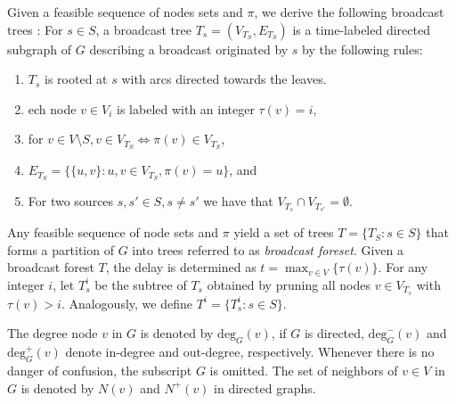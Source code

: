 Given a feasible sequence of nodes sets and $\pi$, we derive the following broadcast trees \cite{grigni91}:
For $s\in S$, a broadcast tree $T_s=(V_{T_S},E_{T_S})$ is a time-labeled directed subgraph of $G$ describing a broadcast originated by $s$ by the following rules:
\begin{enumerate}
\item $T_s$ is rooted at $s$ with arcs directed towards the leaves.
\item ech node $v\in V_i$ is labeled with an integer $\tau(v)=i$,
\item for $v\in V\setminus S, v\in V_{T_S}\Leftrightarrow \pi(v)\in V_{T_S}$, 
\item $E_{T_S}=\{\{u,v\}: u,v\in V_{T_S}, \pi(v)=u\}$, and
\item For two sources $s,s'\in S, s\neq s'$ we have that $V_{T_s}\cap V_{T_{s'}}=\emptyset$. 
\end{enumerate}

Any feasible sequence of node sets and $\pi$ yield a set of trees $T=\{T_S:s\in S\}$ that forms a partition of $G$ into trees referred to as \emph{broadcast foreset}.
Given a broadcast forest $T$, the delay is determined as $t=\max_{v\in V}\{\tau(v)\}$.
For any integer $i$, let $T^i_s$ be the subtree of $T_s$ obtained by pruning all nodes $v\in V_{T_s}$ with $\tau(v)>i$.
Analogously, we define $T^i=\{T^i_s:s\in S\}$. 

The degree node $v$ in $G$ is denoted by $\text{deg}_G(v)$, if $G$ is directed, $\text{deg}^-_G(v)$ and $\text{deg}^+_G(v)$ denote in-degree and out-degree, respectively.
Whenever there is no danger of confusion, the subscript $G$ is omitted.
The set of neighbors of $v\in V$ in $G$ is denoted by $N(v)$ and $N^+(v)$ in directed graphs.



